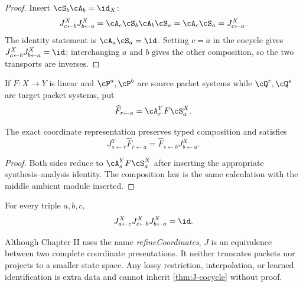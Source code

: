 \begin{proof}
Insert $\cS_b\cA_b=\id_X$:
\[
J^X_{c\leftarrow b}J^X_{b\leftarrow a}
=\cA_c\cS_b\cA_b\cS_a
=\cA_c\cS_a
=J^X_{c\leftarrow a}.
\]
The identity statement is $\cA_a\cS_a=\id$.  Setting $c=a$ in the cocycle
gives $J^X_{a\leftarrow b}J^X_{b\leftarrow a}=\id$; interchanging $a$ and $b$
gives the other composition, so the two transports are inverses.
\end{proof}

If $F:X\to Y$ is linear and $\cP^a,\cP^b$ are source packet systems while
$\cQ^r,\cQ^s$ are target packet systems, put
\[
\widehat F_{r\leftarrow a}
=
\cA^Y_rF\cS^X_a.
\]

\begin{theorem}
\label{thm:canonical-naturality}
The exact coordinate representation preserves typed composition and satisfies
\[
J^Y_{s\leftarrow r}\widehat F_{r\leftarrow a}
=
\widehat F_{s\leftarrow b}J^X_{b\leftarrow a}.
\]
\end{theorem}

\begin{proof}
Both sides reduce to $\cA^Y_sF\cS^X_a$ after inserting the appropriate
synthesis--analysis identity.  The composition law is the same calculation
with the middle ambient module inserted.
\end{proof}

\begin{corollary}
\label{cor:J-flat}
For every triple $a,b,c$,
\[
J^X_{a\leftarrow c}J^X_{c\leftarrow b}J^X_{b\leftarrow a}=\id.
\]
\end{corollary}

\begin{boundary}
Although Chapter II uses the name \emph{refineCoordinates}, $J$ is an
equivalence between two complete coordinate presentations.  It neither
truncates packets nor projects to a smaller state space.  Any lossy
restriction, interpolation, or learned identification is extra data and
cannot inherit \cref{thm:J-cocycle} without proof.
\end{boundary}


